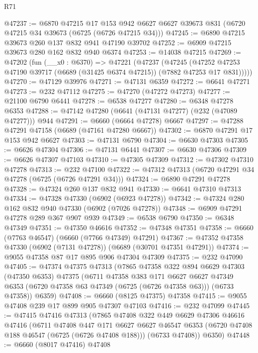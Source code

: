\begin{lexlean}{R71}
\begin{coremodule}
@47237 := @6870
    @47215
    @17
    @153
    @942
    @6627
    @6627
    @39673
    @831
    (@6720 @47215 @34 @39673 (@6725 (@6726 @47215 @34)))
@47245 := @6890 @47215 @39673 @260 @137 @832 @941 @47190 @39702
@47252 := @6909 @47215 @39673 @280 @162 @832 @940 @6374
@47253 := @14038 @47215
@47269 := @47202
    (fun (__x0 : @6370) =>
    @47221
      (@47237
        (@47245
          (@47252 @47253 @47190 @39717 (@6689 (@31425 @6374 @47215)) (@7882 @47253 @17 @831)))))
@47270 := @47129 @39976
@47271 := @47131 @6359
@47272 := @6641 @47271
@47273 := @232 @47112
@47275 := @47270 (@47272 @47273)
@47277 := @21100 @6790 @6441
@47278 := @6538 @47277
@47280 := @6348 @47278 @6353
@47288 := @47142 @47280 (@6641 (@47131 @47277) (@232 (@47089 @47277))) @944
@47291 := @6660 (@6664 @47278) @6667
@47297 := @47288 @47291 @47158 (@6689 (@47161 @47280 @6667))
@47302 := @6870 @47291 @17 @153 @942 @6627
@47303 := @47131 @6790
@47304 := @6630 @47303
@47305 := @6626 @47304
@47306 := @47131 @6441
@47307 := @6630 @47306
@47309 := @6626 @47307 @47103
@47310 := @47305 @47309
@47312 := @47302 @47310 @47278
@47313 := @232 @47100
@47322 := @47312 @47313 (@6720 @47291 @34 @47278 (@6725 (@6726 @47291 @34)))
@47324 := @6890 @47291 @47278
@47328 := @47324 @260 @137 @832 @941
@47330 := @6641 @47310 @47313
@47334 := @47328 @47330 (@6902 (@6923 @47278))
@47342 := @47324 @280 @162 @832 @940 @47330 (@6902 (@7026 @47278))
@47348 := @6909 @47291 @47278 @289 @367 @907 @939
@47349 := @6538 @6790
@47350 := @6348 @47349
@47351 := @47350 @46616
@47352 := @47348 @47351
@47358 := @6660 (@7763 @46547) (@6660 (@7766 @47349) @47291)
@47367 := @47352 @47358 @47330 (@6902 (@7131 @47278)) (@6689 (@30701 @47351 @47291))
@47374 := @9055 @47358 @87 @17 @895 @906 @47304 @47309
@47375 := @232 @47090
@47405 := @47374
    @47375
    @47313
    (@7865
      @47358
      @322
      @894
      @6629
      @47303
      (@47350 @6353)
      @47375
      (@6711
        @47358
        @383
        @171
        @6627
        @6627
        @47349
        @6353
        (@6720 @47358 @63 @47349 (@6725 (@6726 @47358 @63)))
        (@6733 @47358))
      @6359)
@47408 := @6660 (@8125 @47375) @47358
@47415 := @9055 @47408 @239 @17 @899 @905 @47307 @47103
@47416 := @232 @47099
@47445 := @47415
    @47416
    @47313
    (@7865
      @47408
      @322
      @449
      @6629
      @47306
      @46616
      @47416
      (@6711
        @47408
        @447
        @171
        @6627
        @6627
        @46547
        @6353
        (@6720 @47408 @188 @46547 (@6725 (@6726 @47408 @188)))
        (@6733 @47408))
      @6350)
@47448 := @6660 (@8017 @47416) @47408

\end{coremodule}
\end{lexlean}
